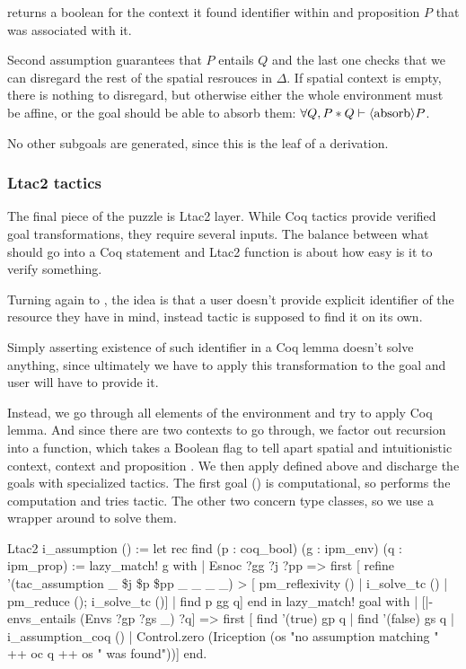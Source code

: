  returns a boolean for the context it found identifier  within and proposition \(P\) that was associated with it.

Second assumption guarantees that \(P\) entails \(Q\) and the last one checks that we can disregard the rest of the spatial resrouces in \(\Delta\).
If spatial context is empty, there is nothing to disregard, but otherwise either the whole environment must be affine, or the goal should be able to absorb them:
\(\forall Q, P * Q \vdash \langle\text{absorb}\rangle P\).

No other subgoals are generated, since this is the leaf of a derivation.

\subsubsection{Ltac2 tactics}
\label{sec:ltac2-tactics}

The final piece of the puzzle is Ltac2 layer.
While Coq tactics provide verified goal transformations, they require several inputs.
The balance between what should go into a Coq statement and Ltac2 function is about how easy is it to verify something.

Turning again to , the idea is that a user doesn't provide explicit identifier of the resource they have in mind, instead tactic is supposed to find it on its own.

Simply asserting existence of such identifier in a Coq lemma doesn't solve anything, since ultimately we have to apply this transformation to the goal and user will have to provide it.

Instead, we go through all elements of the environment and try to apply Coq lemma.
And since there are two contexts to go through, we factor out recursion into a  function, which takes a Boolean flag  to tell apart spatial and intuitionistic context, context  and proposition .
We then apply  defined above and discharge the goals with specialized tactics.
The first goal () is computational, so  performs the computation and tries  tactic.
The other two concern type classes, so we use a wrapper around  to solve them.

\begin{coq}
  Ltac2 i_assumption () :=
  let rec find (p : coq_bool) (g : ipm_env) (q : ipm_prop) :=
      lazy_match! g with
      | Esnoc ?gg ?j ?pp =>
        first [ refine '(tac_assumption _ \$j \$p \$pp _ _ _ _) >
                [ pm_reflexivity () | i_solve_tc () | pm_reduce (); i_solve_tc ()]
              | find p gg q]
      end
  in
  lazy_match! goal with
  | [|- envs_entails (Envs ?gp ?gs _) ?q] =>
     first [ find '(true) gp q
           | find '(false) gs q
           | i_assumption_coq ()
           | Control.zero (Iriception (os "no assumption matching " ++ oc q ++ os " was found"))]
end.
\end{coq}

